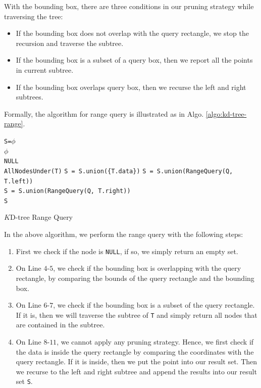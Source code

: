 With the bounding box, there are three conditions in our pruning strategy while traversing the tree:

\begin{itemize}
	\item If the bounding box does not overlap with the query rectangle, we stop the recursion and traverse the subtree.
	\item If the bounding box is a subset of a query box, then we report all the points in current subtree.
	\item If the bounding box overlaps query box, then we recurse the left and right subtrees.
\end{itemize}

Formally, the algorithm for range query is illustrated as in Algo. \ref{algo:kd-tree-range}.

\begin{algorithm}[H]
\SetAlgoLined
{}
	\texttt{S=$\phi$}\\
	 {
		\Return $\phi$ \\
	}
	 {
		\Return \texttt{NULL} \\
	}
	 {
		\Return \texttt{AllNodesUnder(T)}
	}
	 {
		\texttt{S = S.union(\{T.data\})}
	}
	\texttt{S = S.union(RangeQuery(Q, T.left))} \\
	\texttt{S = S.union(RangeQuery(Q, T.right))} \\
	\Return \texttt{S}
 \caption{$K$D-tree Range Query}
 \label{algo:kd-tree-range}
\end{algorithm}

In the above algorithm, we perform the range query with the following steps:

\begin{enumerate}
	\item First we check if the node is \texttt{NULL}, if so, we simply return an empty set.
	\item On Line $4$-$5$, we check if the bounding box is overlapping with the query rectangle, by comparing the bounds of the query rectangle and the bounding box.
	\item On Line $6$-$7$, we check if the bounding box is a subset of the query rectangle. If it is, then we will traverse the subtree of \texttt{T} and simply return all nodes that are contained in the subtree.
	\item On Line $8$-$11$, we cannot apply any pruning strategy. Hence, we first check if the data is inside the query rectangle by comparing the coordinates with the query rectangle. If it is inside, then we put the point into our result set. Then we recurse to the left and right subtree and append the results into our result set \texttt{S}.
\end{enumerate}

